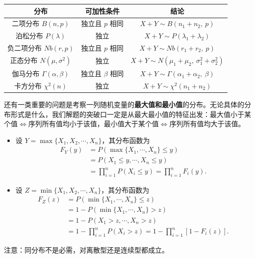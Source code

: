\documentclass[a4paper]{ctexart}
\begin{document}
\vspace{6pt}
\begin{center}
\begin{tabular}{|c|c|c|}
\hline
\textbf{分布} & \textbf{可加性条件} & \textbf{结论} \\
\hline
二项分布 $B(n,p)$ & 独立且 $p$ 相同 & $X+Y \sim B(n_1+n_2,\ p)$ \\
\hline
泊松分布 $P(\lambda)$ & 独立 & $X+Y \sim P(\lambda_1+\lambda_2)$ \\
\hline
负二项分布 $Nb(r,p)$ & 独立且 $p$ 相同 & $X+Y \sim Nb(r_1+r_2,\ p)$ \\
\hline
正态分布 $N(\mu,\sigma^2)$ & 独立 & $X+Y \sim N(\mu_1+\mu_2,\ \sigma_1^2+\sigma_2^2)$ \\
\hline
伽马分布 $\Gamma(\alpha,\beta)$ & 独立且 $\beta$ 相同 & $X+Y \sim \Gamma(\alpha_1+\alpha_2,\ \beta)$ \\
\hline
卡方分布 $\chi^2(n)$ & 独立 & $X+Y \sim \chi^2(n_1+n_2)$ \\
\hline
\end{tabular}
\end{center}
还有一类重要的问题是考察一列随机变量的\textbf{最大值和最小值}的分布。无论具体的分布形式是什么，我们解题的突破口一定是从最大最小值的特征出发：最大值小于某个值$\Leftrightarrow$序列所有值均小于该值，最小值大于某个值$\Leftrightarrow$序列所有值均大于该值。
\begin{itemize}
    \item 设 $Y = \max\{X_1, X_2, \cdots, X_n\}$，其分布函数为
    \[
    \begin{aligned}
    F_Y(y) &= P(\max\{X_1, \cdots, X_n\} \leq y) \\
    &= P(X_1 \leq y, \cdots, X_n \leq y) \\
    &= \prod_{i=1}^n P(X_i \leq y) = \prod_{i=1}^n F_i(y).
    \end{aligned}
    \]
    
    \item 设 $Z = \min\{X_1, X_2, \cdots, X_n\}$，其分布函数为
    \[
    \begin{aligned}
    F_Z(z) &= P(\min\{X_1, \cdots, X_n\} \leq z) \\
    &= 1 - P(\min\{X_1, \cdots, X_n\} > z) \\
    &= 1 - P(X_1 > z, \cdots, X_n > z) \\
    &= 1 - \prod_{i=1}^n P(X_i > z) = 1 - \prod_{i=1}^n [1 - F_i(z)].
    \end{aligned}
    \]
\end{itemize}
注意：同分布不是必需，对离散型还是连续型都成立。
\end{document}
